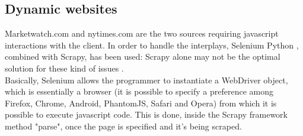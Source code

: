 \subsection{Dynamic websites}
Marketwatch.com and nytimes.com are the two sources requiring javascript interactions with the client. In order to handle the interplays, Selenium Python \cite{selenium}, combined with Scrapy, has been used: Scrapy alone may not be the optimal solution for these kind of issues \cite{scrapyvsselenium}. \\
Basically, Selenium allows the programmer to instantiate a WebDriver object, which is essentially a browser (it is possible to specify a preference among Firefox, Chrome, Android, PhantomJS, Safari and Opera) from which it is possible to execute javascript code. This is done, inside the Scrapy framework method "parse", once the page is specified and it's being scraped. \\

